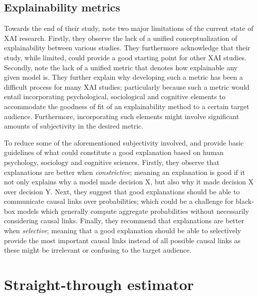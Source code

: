 \subsection{Explainability metrics}

\label{section:xai-metrics}

Towards the end of their study, \citet{arrieta2020explainable} note two major limitations of the current state of XAI research. Firstly, they observe the lack of a unified conceptualization of explainability between various studies. They furthermore acknowledge that their study, while limited, could provide a good starting point for other XAI studies. Secondly, \citet{arrieta2020explainable} note the lack of a unified metric that denotes how explainable any given model is. They further explain why developing such a metric has been a difficult process for many XAI studies; particularly because such a metric would entail incorporating psychological, sociological and cognitive elements to accommodate the goodness of fit of an explainability method to a certain target audience. Furthermore, incorporating such elements might involve significant amounts of subjectivity in the desired metric.

To reduce some of the aforementioned subjectivity involved, \citet{MILLER20191} and \citet{arrieta2020explainable}  provide basic guidelines of what could constitute a good explanation based on human psychology, sociology and cognitive sciences. Firstly, they observe that explanations are better when \textit{constrictive}; meaning an explanation is good if it not only explains why a model made decision X, but also why it made decision X over decision Y. Next, they suggest that good explanations should be able to communicate causal links over probabilities; which could be a challenge for black-box models which generally compute aggregate probabilities without necessarily considering causal links. Finally, they recommend that explanations are better when \textit{selective}; meaning that a good explanation should be able to selectively provide the most important causal links instead of all possible causal links as these might be irrelevant or confusing to the target audience.

\section{Straight-through estimator}

